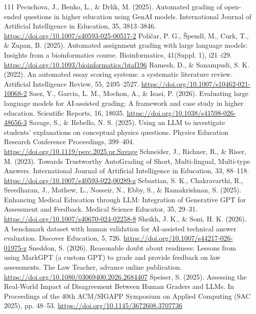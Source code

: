 \begin{thebibliography}{111}
 Pecuchova, J., Benko, L., \& Drlik, M. (2025). Automated grading of open-ended questions in higher education using GenAI models. International Journal of Artificial Intelligence in Education, 35, 3813--3846. \url{https://doi.org/10.1007/s40593-025-00517-2}
 Poli\v{c}ar, P. G., \v{S}pendl, M., Curk, T., \& Zupan, B. (2025). Automated assignment grading with large language models: Insights from a bioinformatics course. Bioinformatics, 41(Suppl. 1), i21--i29. \url{https://doi.org/10.1093/bioinformatics/btaf196}
 Ramesh, D., \& Sanampudi, S. K. (2022). An automated essay scoring systems: a systematic literature review. Artificial Intelligence Review, 55, 2495--2527. \url{https://doi.org/10.1007/s10462-021-10068-2}
 Saez, Y., Garcia, L. M., Mochon, A., \& Isasi, P. (2026). Evaluating large language models for AI-assisted grading: A framework and case study in higher education. Scientific Reports, 16, 18035. \url{https://doi.org/10.1038/s41598-026-48656-3}
 Savage, S., \& Rebello, N. S. (2025). Using an LLM to investigate students' explanations on conceptual physics questions. Physics Education Research Conference Proceedings, 399--404. \url{https://doi.org/10.1119/perc.2025.pr.Savage}
 Schneider, J., Richner, R., \& Riser, M. (2023). Towards Trustworthy AutoGrading of Short, Multi-lingual, Multi-type Answers. International Journal of Artificial Intelligence in Education, 33, 88--118. \url{https://doi.org/10.1007/s40593-022-00289-z}
 Sebastian, S. K., Chakravarthi, R., Sreedharan, J., Mathew, L., Nosseir, N., Ebby, S., \& Ramakrishnan, S. (2025). Enhancing Medical Education through LLM: Integration of Generative GPT for Assessment and Feedback. Medical Science Educator, 35, 29--31. \url{https://doi.org/10.1007/s40670-024-02258-8}
 Sheikh, J. K., \& Soni, H. K. (2026). A benchmark dataset with human validation for AI-assisted technical answer evaluation. Discover Education, 5, 726. \url{https://doi.org/10.1007/s44217-026-01975-z}
 Sneddon, S. (2026). Reasonable doubt about readiness: Lessons from using MarkGPT (a custom GPT) to grade and provide feedback on law assessments. The Law Teacher, advance online publication. \url{https://doi.org/10.1080/03069400.2026.2684407}
 Speiser, S. (2025). Assessing the Real-World Impact of Disagreement Between Human Graders and LLMs. In Proceedings of the 40th ACM/SIGAPP Symposium on Applied Computing (SAC 2025), pp. 48--53. \url{https://doi.org/10.1145/3672608.3707736}

\end{thebibliography}
